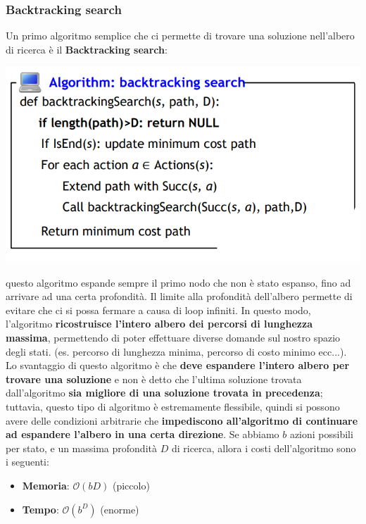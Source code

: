 \documentclass[12pt]{article}
\begin{document}
\subsubsection{Backtracking search}
Un primo algoritmo semplice che ci permette di trovare una soluzione nell'albero di ricerca
è il \textbf{Backtracking search}:
\begin{center}
    \includegraphics[width = 0.70\linewidth]{Images/26.PNG}
\end{center}
questo algoritmo espande sempre il primo nodo che non è stato espanso, fino ad arrivare ad una certa profondità.
Il limite alla profondità dell'albero permette di evitare che ci si possa fermare a causa di loop infiniti.
In questo modo, l'algoritmo \textbf{ricostruisce l'intero albero dei percorsi di lunghezza massima}, permettendo di poter effettuare
diverse domande sul nostro spazio degli stati. (es. percorso di lunghezza minima, percorso di costo minimo ecc...).
Lo svantaggio di questo algoritmo è che \textbf{deve espandere l'intero albero per trovare una soluzione} e non è detto che l'ultima soluzione trovata dall'algoritmo
\textbf{sia migliore di una soluzione trovata in precedenza}; tuttavia, questo tipo di algoritmo è estremamente flessibile, quindi si possono avere
delle condizioni arbitrarie che \textbf{impediscono all'algoritmo di continuare ad espandere l'albero in una certa direzione}.
Se abbiamo $b$ azioni possibili per stato, e un massima profondità $D$ di ricerca, allora i costi dell'algoritmo sono i seguenti:
\begin{itemize}
    \item \textbf{Memoria}: $\mathcal{O}(bD)$ (piccolo)
    \item \textbf{Tempo}: $\mathcal{O}(b^D)$ (enorme)
\end{itemize}
\end{document}
